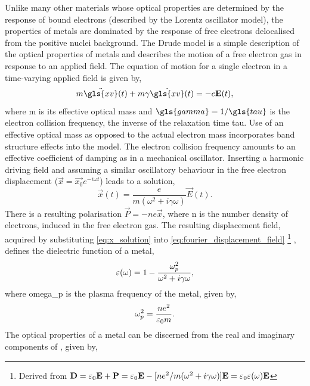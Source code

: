 \documentclass{article}
\begin{document}
Unlike many other materials whose optical properties are determined by the response of bound electrons (described by the Lorentz oscillator model), the properties of metals are dominated by the response of free electrons delocalised from the positive nuclei background. The Drude model \cite{drude1900} is a simple description of the optical properties of metals and describes the motion of a free electron gas in response to an applied field. The equation of motion for a single electron in a time-varying applied field is given by,
\begin{equation}
	m\ddot{\gls{xv}}(t) + m\gamma \dot{\gls{xv}}(t) = -e\vec{E}(t),
\end{equation}
where \gls{m} is its effective optical mass and $\gls{gamma} = 1/\gls{tau}$ is the electron collision frequency, the inverse of the relaxation time \gls{tau}. Use of an effective optical mass as opposed to the actual electron mass incorporates band structure effects into the model. {\color{red}The electron collision frequency amounts to an effective coefficient of damping as in a mechanical oscillator.}
Inserting a harmonic driving field and assuming a similar oscillatory behaviour in the free electron displacement ($\vec{x} = \vec{x_0}e^{-i\omega t}$) leads to a solution,
\begin{equation}
	\vec{x}(t) = \frac{e}{m(\omega^2 + i\gamma\omega)}\vec{E}(t).
	\label{eq:x_solution}
\end{equation}
There is a resulting polarisation $\vec{P}=-ne\vec{x}$, where \gls{n} is the number density of electrons, induced in the free electron gas. The resulting displacement field, {\color{red}acquired} by substituting \eqref{eq:x_solution} into \eqref{eq:fourier_displacement_field}%
\footnote{Derived from $\vec{D}=\epsfs\vec{E} + \vec{P} = \epsfs\vec{E} - [ne^2/m(\omega^2 + i\gamma\omega)]\vec{E} = \epsfs\eps(\omega)\vec{E}$}
, defines the dielectric function of a metal,
\begin{equation}
	\eps(\omega) = 1 - \frac{\omegap[2]}{\omega^2 + i\gamma\omega},
\end{equation}
where \gls{omega_p} is the plasma frequency of the metal, given by,
\begin{equation}
	\omegap[2] = \frac{ne^2}{\varepsilon_0 m}.
\label{eq:plasma_frequency}
\end{equation}
The optical properties of a metal can be discerned from the real and imaginary components of \dielectric, given by,
\end{document}
